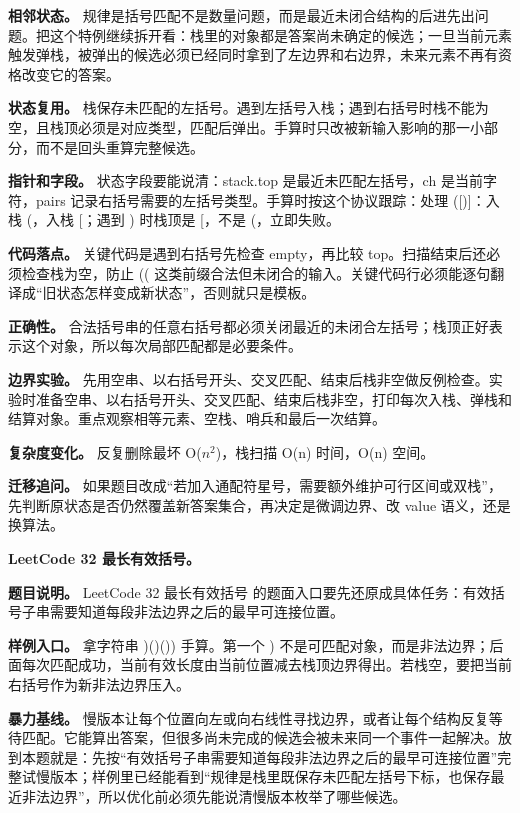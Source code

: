 \textbf{相邻状态。} 规律是括号匹配不是数量问题，而是最近未闭合结构的后进先出问题。把这个特例继续拆开看：栈里的对象都是答案尚未确定的候选；一旦当前元素触发弹栈，被弹出的候选必须已经同时拿到了左边界和右边界，未来元素不再有资格改变它的答案。

\textbf{状态复用。} 栈保存未匹配的左括号。遇到左括号入栈；遇到右括号时栈不能为空，且栈顶必须是对应类型，匹配后弹出。手算时只改被新输入影响的那一小部分，而不是回头重算完整候选。

\textbf{指针和字段。} 状态字段要能说清：stack.top 是最近未匹配左括号，ch 是当前字符，pairs 记录右括号需要的左括号类型。手算时按这个协议跟踪：处理 ([)]：入栈 (，入栈 [；遇到 ) 时栈顶是 [，不是 (，立即失败。

\textbf{代码落点。} 关键代码是遇到右括号先检查 empty，再比较 top。扫描结束后还必须检查栈为空，防止 (( 这类前缀合法但未闭合的输入。关键代码行必须能逐句翻译成“旧状态怎样变成新状态”，否则就只是模板。

\textbf{正确性。} 合法括号串的任意右括号都必须关闭最近的未闭合左括号；栈顶正好表示这个对象，所以每次局部匹配都是必要条件。

\textbf{边界实验。} 先用空串、以右括号开头、交叉匹配、结束后栈非空做反例检查。实验时准备空串、以右括号开头、交叉匹配、结束后栈非空，打印每次入栈、弹栈和结算对象。重点观察相等元素、空栈、哨兵和最后一次结算。

\textbf{复杂度变化。} 反复删除最坏 O(\ensuremath{n^{2}})，栈扫描 O(n) 时间，O(n) 空间。

\textbf{迁移追问。} 如果题目改成“若加入通配符星号，需要额外维护可行区间或双栈”，先判断原状态是否仍然覆盖新答案集合，再决定是微调边界、改 value 语义，还是换算法。

\noindent\textbf{LeetCode 32 最长有效括号。}

\textbf{题目说明。} LeetCode 32 最长有效括号 的题面入口要先还原成具体任务：有效括号子串需要知道每段非法边界之后的最早可连接位置。

\textbf{样例入口。} 拿字符串 )()()) 手算。第一个 ) 不是可匹配对象，而是非法边界；后面每次匹配成功，当前有效长度由当前位置减去栈顶边界得出。若栈空，要把当前右括号作为新非法边界压入。

\textbf{暴力基线。} 慢版本让每个位置向左或向右线性寻找边界，或者让每个结构反复等待匹配。它能算出答案，但很多尚未完成的候选会被未来同一个事件一起解决。放到本题就是：先按“有效括号子串需要知道每段非法边界之后的最早可连接位置”完整试慢版本；样例里已经能看到“规律是栈里既保存未匹配左括号下标，也保存最近非法边界”，所以优化前必须先能说清慢版本枚举了哪些候选。

